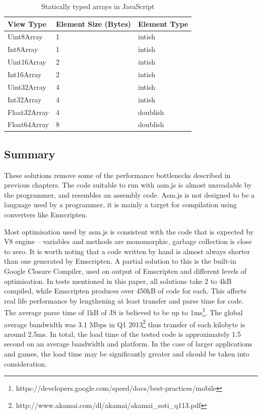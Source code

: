 \begin{table}[h!]
\caption{Statically typed arrays in JavaScript}
\centering
\label{table:jsarrays}
\begin{tabular}{|l|l|l|}
  	\hline
View Type & Element Size (Bytes) & Element Type \\ \hline
Uint8Array & 1 & intish \\ \hline
Int8Array & 1 & intish \\ \hline
Uint16Array & 2 & intish \\ \hline
Int16Array & 2 & intish \\ \hline
Uint32Array & 4 & intish \\ \hline
Int32Array & 4 & intish \\ \hline
Float32Array & 4 & doublish \\ \hline
Float64Array & 8 & doublish \\ \hline
\end{tabular}
\end{table}

\subsection{Summary}
\label{sec:asmjssummary}

These solutions remove some of the performance bottlenecks described in previous chapters. The code suitable to run with asm.js is almost unreadable by the programmer, and resembles an assembly code. Asm.js is not designed to be a language used by a programmer, it is mainly a target for compilation using converters like Emscripten.

Most optimisation used by asm.js is consistent with the code that is expected by V8 engine -- variables and methods are monomorphic, garbage collection is close to zero. It is worth noting that a code written by hand is almost always shorter than one generated by Emscripten. A partial solution to this is the built-in Google Closure Compiler, used on output of Emscripten and different levels of optimisation.
In tests mentioned in this paper, all solutions take 2 to 4kB compiled, while Emscripten produces over 450kB of code for each. This affects real life performance by lengthening at least transfer and parse time for code. The average parse time of 1kB of JS is believed to be up to 1ms\footnote{https://developers.google.com/speed/docs/best-practices/mobile}. The global average bandwidth was 3.1 Mbps in Q1 2013\footnote{http://www.akamai.com/dl/akamai/akamai\_soti\_q113.pdf} thus transfer of each kilobyte is around 2.5ms. In total, the load time of the tested code is approximately 1.5 second on an average bandwidth and platform. In the case of larger applications and games, the load time may be significantly greater and should be taken into consideration.
